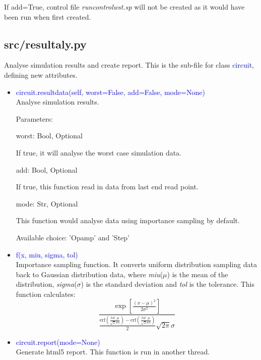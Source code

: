 \documentclass[12pt,a4paper]{article}
\begin{document}
\begin{itemize}[leftmargin=*]
\begin{itemize}[leftmargin=*]
        If add=True, control file \textit{run\textunderscore control\textunderscore wst.sp} will not be created as it would have been run when first created.

\end{itemize}

\subsection{src/\textunderscore resultaly.py}
Analyse simulation results and create report. This is the sub-file for class \textcolor{blue}{circuit}, defining new attributes.

\begin{itemize}
    \item \textcolor{blue}{circuit.resultdata(self, worst=False, add=False, mode=None)}\\
        Analyse simulation results.

        Parameters:

        worst: Bool, Optional\par
        \quad If true, it will analyse the worst case simulation data.

        add: Bool, Optional\par
        \quad If true, this function read in data from last end read point.

        mode: Str, Optional\par
        \quad This function would analyse data using importance sampling by default.

        \quad Available choice: 'Opamp' and 'Step'

    \item \textcolor{blue}{f(x, miu, sigma, tol)}\\
        Importance sampling function. It converts uniform distribution sampling data back to Gaussian distribution data, where \textit{miu}($\mu$) is the mean of the distribution, \textit{sigma}($\sigma$) is the standard deviation and \textit{tol} is the tolerance. This function calculates:
        \begin{equation*}
            \frac{\exp\left [\frac{(x-\mu)^2}{2\sigma^2}\right ]}{\frac{\text{erf}(\frac{tol\cdot\mu}{\sqrt{2}\sigma\pi})-\text{erf}(\frac{tol\cdot\mu}{\sqrt{2}\sigma\pi})}{2}\sqrt{2\pi}\sigma}
        \end{equation*}

    \item \textcolor{blue}{circuit.report(mode=None)}\\
        Generate html5 report. This function is run in another thread.
\end{itemize}


\end{itemize}
\end{document}
